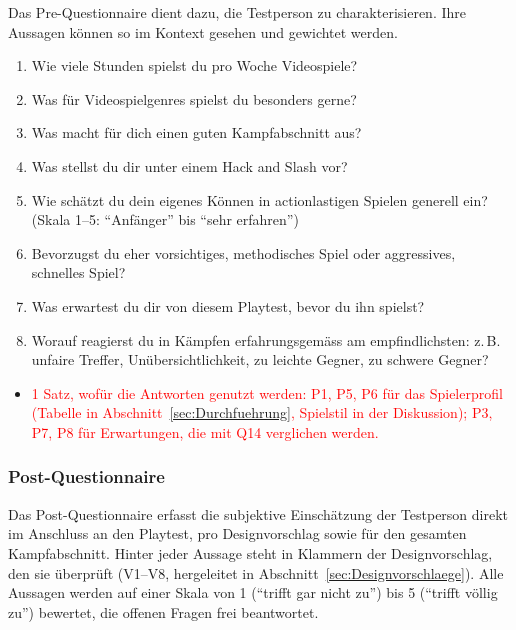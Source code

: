 \documentclass[../Main.tex]{subfiles}
\begin{document}
Das Pre-Questionnaire dient dazu, die Testperson zu charakterisieren. Ihre Aussagen können so im Kontext gesehen und gewichtet werden.

\begin{enumerate}[label=\textbf{P\arabic*}, leftmargin=1.5cm, itemsep=0.5em]
    \item Wie viele Stunden spielst du pro Woche Videospiele?
    \item Was für Videospielgenres spielst du besonders gerne?
    \item Was macht für dich einen guten Kampfabschnitt aus?
    \item Was stellst du dir unter einem Hack and Slash vor?
    \item Wie schätzt du dein eigenes Können in actionlastigen Spielen generell ein? (Skala 1--5: \enquote{Anfänger} bis \enquote{sehr erfahren})
    \item Bevorzugst du eher vorsichtiges, methodisches Spiel oder aggressives, schnelles Spiel?
    \item Was erwartest du dir von diesem Playtest, bevor du ihn spielst?
    \item Worauf reagierst du in Kämpfen erfahrungsgemäss am empfindlichsten: z.\,B. unfaire Treffer, Unübersichtlichkeit, zu leichte Gegner, zu schwere Gegner?
\end{enumerate}

\begin{itemize}[leftmargin=1.5cm]
    \item \textcolor{red}{1 Satz, wofür die Antworten genutzt werden: P1, P5, P6 für das Spielerprofil (Tabelle in Abschnitt~\ref{sec:Durchfuehrung}, Spielstil in der Diskussion); P3, P7, P8 für Erwartungen, die mit Q14 verglichen werden.}
\end{itemize}

\subsubsection{Post-Questionnaire} \label{sec:PostQuestionnaire}

Das Post-Questionnaire erfasst die subjektive Einschätzung der Testperson direkt im Anschluss an den Playtest, pro Designvorschlag sowie für den gesamten Kampfabschnitt. Hinter jeder Aussage steht in Klammern der Designvorschlag, den sie überprüft (V1--V8, hergeleitet in Abschnitt~\ref{sec:Designvorschlaege}). Alle Aussagen werden auf einer Skala von 1 (\enquote{trifft gar nicht zu}) bis 5 (\enquote{trifft völlig zu}) bewertet, die offenen Fragen frei beantwortet.
\end{document}
